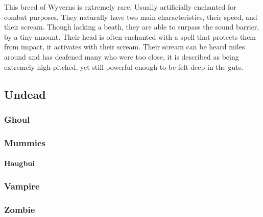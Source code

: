 This breed of Wyverns is extremely rare. Usually artificially enchanted
for combat purposes. They naturally have two main characteristics, their
speed, and their scream. Though lacking a beath, they are able to
surpass the sound barrier, by a tiny amount. Their head is often
enchanted with a spell that protects them from impact, it activates with
their scream. Their scream can be heard miles around and has deafened
many who were too close, it is described as being extremely
high-pitched, yet still powerful enough to be felt deep in the guts.

\hypertarget{undead}{%
\subsection{Undead}\label{undead}}

\hypertarget{ghoul}{%
\subsubsection{Ghoul}\label{ghoul}}

\hypertarget{mummies}{%
\subsubsection{Mummies}\label{mummies}}

\hypertarget{haugbui}{%
\paragraph{Haugbui}\label{haugbui}}

\hypertarget{vampire}{%
\subsubsection{Vampire}\label{vampire}}

\hypertarget{zombie}{%
\subsubsection{Zombie}\label{zombie}}
